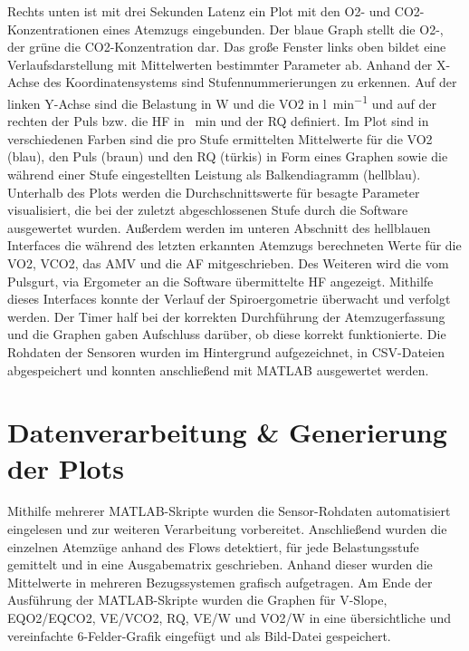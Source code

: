 Rechts unten ist mit drei Sekunden Latenz ein Plot mit den \gls{O2}- und \gls{CO2}-Konzentrationen eines Atemzugs eingebunden. Der blaue Graph stellt die \gls{O2}-, der grüne die \gls{CO2}-Konzentration dar. Das große Fenster links oben bildet eine Verlaufsdarstellung mit Mittelwerten bestimmter Parameter ab. Anhand der X-Achse des Koordinatensystems sind Stufennummerierungen zu erkennen. Auf der linken Y-Achse sind die Belastung in \si{\watt} und die \gls{VO2} in \si{\litre\per\minute} und auf der rechten der Puls bzw. die \gls{HF} in \si{\per\minute} und der \gls{RQ} definiert. Im Plot sind in verschiedenen Farben sind die pro Stufe ermittelten Mittelwerte für die \gls{VO2} (blau), den Puls (braun) und den \gls{RQ} (türkis) in Form eines Graphen sowie die während einer Stufe eingestellten Leistung als Balkendiagramm (hellblau). Unterhalb des Plots werden die Durchschnittswerte für besagte Parameter visualisiert, die bei der zuletzt abgeschlossenen Stufe durch die Software ausgewertet wurden. Außerdem werden im unteren Abschnitt des hellblauen Interfaces die während des letzten erkannten Atemzugs berechneten Werte für die \gls{VO2}, \gls{VCO2}, das \gls{AMV} und die \gls{AF} mitgeschrieben. Des Weiteren wird die vom Pulsgurt, via Ergometer an die Software übermittelte \gls{HF} angezeigt. Mithilfe dieses Interfaces konnte der Verlauf der Spiroergometrie überwacht und verfolgt werden. Der Timer half bei der korrekten Durchführung der Atemzugerfassung und die Graphen gaben Aufschluss darüber, ob diese korrekt funktionierte. Die Rohdaten der Sensoren wurden im Hintergrund aufgezeichnet, in \acrshort{CSV}-Dateien abgespeichert und konnten anschließend mit MATLAB ausgewertet werden.
%
\section{Datenverarbeitung \& Generierung der Plots}
%
Mithilfe mehrerer MATLAB-Skripte wurden die Sensor-Rohdaten automatisiert eingelesen und zur weiteren Verarbeitung vorbereitet. Anschließend wurden die einzelnen Atemzüge anhand des Flows detektiert, für jede Belastungsstufe gemittelt und in eine Ausgabematrix geschrieben. Anhand dieser wurden die Mittelwerte in mehreren Bezugssystemen grafisch aufgetragen. Am Ende der Ausführung der MATLAB-Skripte wurden die Graphen für V-Slope, \gls{EQO2}/\gls{EQCO2}, \gls{VE}/\gls{VCO2}, \gls{RQ}, \gls{VE}/\gls{W} und \gls{VO2}/\gls{W} in eine übersichtliche und vereinfachte 6-Felder-Grafik eingefügt und als Bild-Datei gespeichert. 
%
